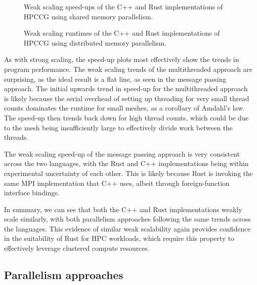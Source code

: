 \begin{figure}[H]
    \centering
    \fbox{}
    \captionsetup{skip=0pt}
    \caption{Weak scaling speed-ups of the C++ and Rust implementations of \acrshort{HPCCG} using shared memory parallelism.}
    \label{fig:weak_scaling_speedup_threaded}
\end{figure}

\begin{figure}[H]
    \centering
    \fbox{}
    \captionsetup{skip=0pt}
    \caption{Weak scaling runtimes of the C++ and Rust implementations of \acrshort{HPCCG} using distributed memory parallelism.}
    \label{fig:weak_scaling_speedup_mpi}
\end{figure}

As with strong scaling, the speed-up plots most effectively show the trends in program performance. The weak scaling trends of the multithreaded approach are surprising, as the ideal result is a flat line, as seen in the message passing approach. The initial upwards trend in speed-up for the multithreaded approach is likely because the serial overhead of setting up threading for very small thread counts dominates the runtime for small meshes, as a corollary of Amdahl's law. The speed-up then trends back down for high thread counts, which could be due to the mesh being insufficiently large to effectively divide work between the threads.

The weak scaling speed-up of the message passing approach is very consistent across the two languages, with the Rust and C++ implementations being within experimental uncertainty of each other. This is likely because Rust is invoking the same MPI implementation that C++ uses, albeit through foreign-function interface bindings.

In summary, we can see that both the C++ and Rust implementations weakly scale similarly, with both parallelism approaches following the same trends across the languages. This evidence of similar weak scalability again provides confidence in the suitability of Rust for \acrshort{HPC} workloads, which require this property to effectively leverage clustered compute resources.




\subsection{Parallelism approaches}
\label{ssec:parallelism-approaches}

